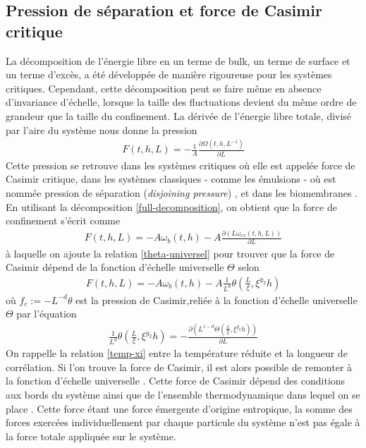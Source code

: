     \subsection{Pression de séparation et force de Casimir critique}

La décomposition de l'énergie libre en un terme de bulk, un terme de surface et un terme d'excès, a été développée de manière rigoureuse pour les systèmes critiques. Cependant, cette décomposition peut se faire même en absence d'invariance d'échelle, lorsque la taille des fluctuations devient du même ordre de grandeur que la taille du confinement. La dérivée de l'énergie libre totale, divisé par l'aire du système nous donne la pression
\begin{align}
    F(t,h,L) = -\frac{1}{A} \frac{\partial \Omega(t,h,L^{-1})}{\partial L}
\end{align}
Cette pression se retrouve dans les systèmes critiques\cite{degennes} où elle est appelée force de Casimir critique, dans les systèmes classiques - comme les émulsions - où est nommée pression de séparation (\textit{disjoining pressure})  \cite{stubenrauch_disjoining_2003}, et dans les biomembranes \cite{bitbol_fluctuations_2010}.
En utilisant la décomposition \ref{full-decomposition}, on obtient que la force de confinement s'écrit comme
\begin{align}
    F(t,h,L) = - A \omega_b(t,h) - A \frac{\partial(L \omega_{ex}(t,h,L))}{\partial L}
\end{align}
à laquelle on ajoute la relation \ref{theta-universel} pour trouver que la force de Casimir dépend de la fonction d'échelle universelle $\Theta$ selon
\begin{align}
    F(t,h,L) = - A \omega_b(t,h) - A \frac{1}{L^d} \theta(\frac{L}{\xi},\xi^{y_2}h)
\end{align}
où $f_c := -L^{-d} \theta$ est la pression de Casimir,reliée à la fonction d'échelle universelle $\Theta$ par l'équation 
\begin{align}
    \frac{1}{L^d }\theta(\frac{L}{\xi},\xi^{y_2}h) = - \frac{\partial (L^{1-d} \Theta(\frac{L}{\xi},\xi^{y_2}h))}{\partial L}
\end{align}
On rappelle la relation \ref{temp-xi} entre la température réduite et la longueur de corrélation.
Si l'on trouve la force de Casimir, il est alors possible de remonter à la fonction d'échelle universelle \cite{vasilyev_universal_2009}. Cette force de Casimir dépend des conditions aux bords du système \cite{dantchev_casimir_2017,dantchev_exact_2016} ainsi que de l'ensemble thermodynamique dans lequel on se place \cite{gross_critical_2016,rohwer_transient_2017}. 
 Cette force étant une force émergente d'origine entropique, la somme des forces exercées individuellement par chaque particule du système n'est pas égale à la force totale appliquée sur le système\cite{paladugu_nonadditivity_2016}.

